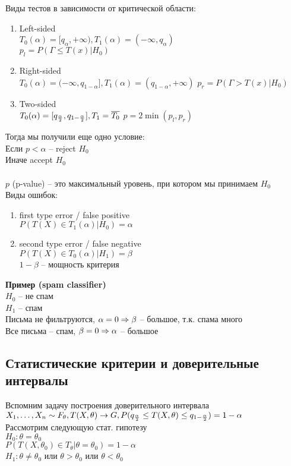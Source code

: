 \documentclass[12pt]{article}
\begin{document}
Виды тестов в зависимости от критической области:
\begin{enumerate}
	\item Left-sided\\
	$T_0(\alpha) = [q_\alpha, +\infty), T_1(\alpha) = (-\infty, q_\alpha)$\\
	$p_l = P(\Gamma \leq T(x) | H_0)$
	\item Right-sided\\
	$T_0(\alpha) = (-\infty,q_{1-\alpha}], T_1(\alpha) = (q_{1-\alpha}, +\infty)$
	$p_r = P(\Gamma > T(x) | H_0)$
	\item Two-sided\\
	$T_0(\alpha) = [q_{\frac\alpha2}, q_{1-\frac\alpha2}], T_1 = \overline{T_0}$
	$p=2\min(p_l, p_r)$
\end{enumerate}
Тогда мы получили еще одно условие:\\
Если $p < \alpha$ -- reject $H_0$\\
Иначе accept $H_0$\\\\
$p$ (p-value) -- это максимальный уровень, при котором мы принимаем $H_0$\\
Виды ошибок:
\begin{enumerate}
	\item first type error / false positive\\
	$P(T(X) \in T_1(\alpha) | H_0) = \alpha$
	\item second type error / false negative\\
	$P(T(X) \in T_0(\alpha) | H_1) = \beta$\\
	$1 - \beta$ -- мощность критерия
\end{enumerate}
\textbf{Пример (spam classifier)}\\
$H_0$ -- не спам\\
$H_1$ -- спам\\
Письма не фильтруются, $\alpha = 0 \Rightarrow \beta$ -- большое, т.к. спама много\\
Все письма -- спам, $\beta = 0 \Rightarrow \alpha$ -- большое
\subsection{Статистические критерии и доверительные интервалы}
Вспомним задачу построения доверительного интервала\\
$X_1, \ldots, X_n \sim F_\theta, T(X, \theta) \rightarrow G, P(q_{\frac{\alpha}{2}} \leq T(X, \theta) \leq q_{1-\frac{\alpha}{2}}) = 1 - \alpha$\\
Рассмотрим следующую стат. гипотезу\\
$H_0: \theta = \theta_0$\\
$P(T(X, \theta_0) \in T_{\theta}|\theta = \theta_0) = 1-\alpha$\\
$H_1: \theta \neq \theta_0$ или $\theta > \theta_0$ или $\theta < \theta_0$\\\\
\end{document}
